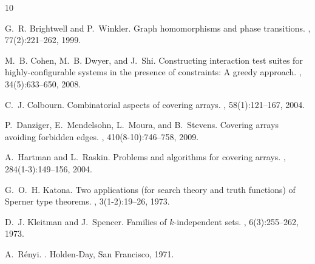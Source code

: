 \documentclass[11pt,a4paper]{article}
\theoremstyle{definition}
\theoremstyle{remark}
\begin{document}

\begin{thebibliography}{10}

G.~R. Brightwell and P.~Winkler.
\newblock Graph homomorphisms and phase transitions.
, 77(2):221--262, 1999.

M.~B. Cohen, M.~B. Dwyer, and J.~Shi.
\newblock Constructing interaction test suites for highly-configurable systems in the presence of constraints: A greedy approach.
, 34(5):633--650, 2008.

C.~J. Colbourn.
\newblock Combinatorial aspects of covering arrays.
, 58(1):121--167, 2004.

P.~Danziger, E.~Mendelsohn, L.~Moura, and B.~Stevens.
\newblock Covering arrays avoiding forbidden edges.
, 410(8-10):746--758, 2009.

A.~Hartman and L.~Raskin.
\newblock Problems and algorithms for covering arrays.
, 284(1-3):149--156, 2004.

G.~O.~H. Katona.
\newblock Two applications (for search theory and truth functions) of {S}perner type theorems.
, 3(1-2):19--26, 1973.

D.~J. Kleitman and J.~Spencer.
\newblock Families of $k$-independent sets.
, 6(3):255--262, 1973.

A.~R{\'e}nyi.
.
\newblock Holden-Day, San Francisco, 1971.

\end{thebibliography}
\end{document}

